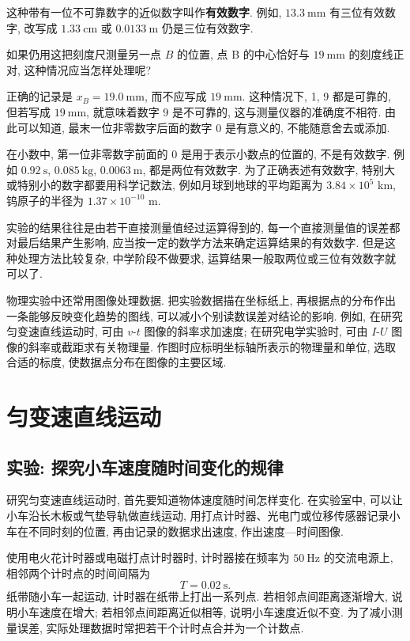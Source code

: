 \documentclass[UTF8,openany,fontset=fandol]{ctexbook}
\theoremstyle{chinesetextbook}
\newcommand{\unit}[1]{\ \mathrm{#1}}
\begin{document}
这种带有一位不可靠数字的近似数字叫作\textbf{有效数字}. 例如, $13.3\unit{mm}$ 有三位有效数字, 改写成 $1.33\unit{cm}$ 或 $0.0133\unit{m}$ 仍是三位有效数字.

{\kaishu 如果仍用这把刻度尺测量另一点 $B$ 的位置, 点 B 的中心恰好与 $19\unit{mm}$ 的刻度线正对, 这种情况应当怎样处理呢?}

正确的记录是 $x_B=19.0\unit{mm}$, 而不应写成 $19\unit{mm}$. 这种情况下, 1, 9 都是可靠的, 但若写成 $19\unit{mm}$, 就意味着数字 9 是不可靠的, 这与测量仪器的准确度不相符. 由此可以知道, 最末一位非零数字后面的数字 0 是有意义的, 不能随意舍去或添加.

在小数中, 第一位非零数字前面的 0 是用于表示小数点的位置的, 不是有效数字. 例如 $0.92\unit{s}$, $0.085\unit{kg}$, $0.0063\unit{m}$, 都是两位有效数字. 为了正确表述有效数字, 特别大或特别小的数字都要用科学记数法, 例如月球到地球的平均距离为 $3.84\times 10^5$ km, 钨原子的半径为 $1.37\times10^{-10}$ m.

实验的结果往往是由若干直接测量值经过运算得到的, 每一个直接测量值的误差都对最后结果产生影响, 应当按一定的数学方法来确定运算结果的有效数字. 但是这种处理方法比较复杂, 中学阶段不做要求, 运算结果一般取两位或三位有效数字就可以了.

物理实验中还常用图像处理数据. 把实验数据描在坐标纸上, 再根据点的分布作出一条能够反映变化趋势的图线, 可以减小个别读数误差对结论的影响. 例如, 在研究匀变速直线运动时, 可由 $v$-$t$ 图像的斜率求加速度; 在研究电学实验时, 可由 $I$-$U$ 图像的斜率或截距求有关物理量. 作图时应标明坐标轴所表示的物理量和单位, 选取合适的标度, 使数据点分布在图像的主要区域.
\chapter{匀变速直线运动}
\section{实验: 探究小车速度随时间变化的规律}
研究匀变速直线运动时, 首先要知道物体速度随时间怎样变化. 在实验室中, 可以让小车沿长木板或气垫导轨做直线运动, 用打点计时器、光电门或位移传感器记录小车在不同时刻的位置, 再由记录的数据求出速度, 作出速度—时间图像.

使用电火花计时器或电磁打点计时器时, 计时器接在频率为 $50\unit{Hz}$ 的交流电源上, 相邻两个计时点的时间间隔为
\[
T=0.02\unit{s}.
\]
纸带随小车一起运动, 计时器在纸带上打出一系列点. 若相邻点间距离逐渐增大, 说明小车速度在增大; 若相邻点间距离近似相等, 说明小车速度近似不变. 为了减小测量误差, 实际处理数据时常把若干个计时点合并为一个计数点.
\end{document}
